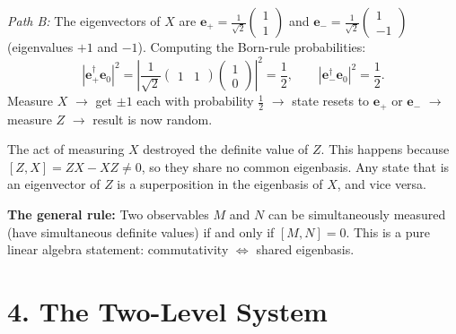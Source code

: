 \documentclass[12pt,a4paper]{article}
\begin{document}
\medskip
\noindent\textit{Path B:} The eigenvectors of $X$ are $\mathbf{e}_+ = \tfrac{1}{\sqrt{2}}\begin{pmatrix}1\\1\end{pmatrix}$ and $\mathbf{e}_- = \tfrac{1}{\sqrt{2}}\begin{pmatrix}1\\-1\end{pmatrix}$ (eigenvalues $+1$ and $-1$).  Computing the Born-rule probabilities:
\[
    |\mathbf{e}_+^\dagger\mathbf{e}_0|^2 = \left|\frac{1}{\sqrt{2}}\begin{pmatrix}1&1\end{pmatrix}\begin{pmatrix}1\\0\end{pmatrix}\right|^2 = \frac{1}{2}, \qquad
    |\mathbf{e}_-^\dagger\mathbf{e}_0|^2 = \frac{1}{2}.
\]
Measure $X$ $\to$ get $\pm 1$ each with probability $\tfrac{1}{2}$ $\to$ state resets to $\mathbf{e}_+$ or $\mathbf{e}_-$ $\to$ measure $Z$ $\to$ result is now random.

\medskip
The act of measuring $X$ destroyed the definite value of $Z$.  This happens because $[Z, X] = ZX - XZ \neq 0$, so they share no common eigenbasis.  Any state that is an eigenvector of $Z$ is a superposition in the eigenbasis of $X$, and vice versa.

\medskip
\noindent{}

\medskip
\noindent\textbf{The general rule:} Two observables $M$ and $N$ can be simultaneously measured (have simultaneous definite values) if and only if $[M, N] = 0$.  This is a pure linear algebra statement: commutativity $\Leftrightarrow$ shared eigenbasis.

\section{4. The Two-Level System}
\end{document}

